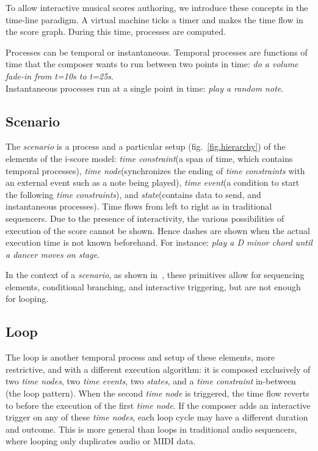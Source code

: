 \documentclass{article}
\newcommand{\scenario}{\textit{scenario}\xspace}
\newcommand{\state}{\textit{state}\xspace}
\newcommand{\states}{\textit{states}\xspace}
\newcommand{\timeevent}{\textit{time event}\xspace}
\newcommand{\timeevents}{\textit{time events}\xspace}
\newcommand{\timenode}{\textit{time node}\xspace}
\newcommand{\timenodes}{\textit{time nodes}\xspace}
\newcommand{\timeconstraint}{\textit{time constraint}\xspace}
\newcommand{\timeconstraints}{\textit{time constraints}\xspace}
\begin{document}
To allow interactive musical scores authoring, we introduce these concepts in the time-line paradigm.
A virtual machine ticks a timer and makes the time flow in the score graph. 
During this time, processes are computed.

Processes can be temporal or instantaneous.
Temporal processes are functions of time that the composer wants to run between 
two points in time: \emph{do a volume fade-in from t=10s to t=25s}.~\\
Instantaneous processes run at a single point in time: \emph{play a random note}.

\subsection{Scenario}
The \scenario is a process and a particular setup (fig.~\ref{fig.hierarchy}) of the elements of the i-score model: \timeconstraint (a span of time, which contains temporal processes), \timenode (synchronizes the ending of \timeconstraints with an external event such as a note being played), \timeevent (a condition to start the following \timeconstraints ), and \state (contains data to send, and instantaneous processes).
Time flows from left to right as in traditional sequencers. 
Due to the presence of interactivity, the various possibilities of execution of the score cannot be shown. 
Hence dashes are shown when the actual execution time is not known beforehand. 
For instance: \emph{play a D minor chord until a dancer moves on stage}.

In the context of a \scenario, as shown in~\cite{celerier2015ossia}, these primitives allow for sequencing elements, conditional branching, and interactive triggering, but are not enough for looping.

\subsection{Loop}
The loop is another temporal process and setup of these elements, more restrictive, and with a different execution algorithm: it is 
composed exclusively of two \timenodes, two \timeevents, two \states, and a \timeconstraint in-between (the loop pattern).
When the second \timenode is triggered, the time flow reverts to before the execution of the first \timenode.
If the composer adds an interactive trigger on any of these \timenodes, each loop cycle may have a different duration and outcome.
This is more general than loops in traditional audio sequencers, where looping only duplicates audio or MIDI data.
\end{document}
